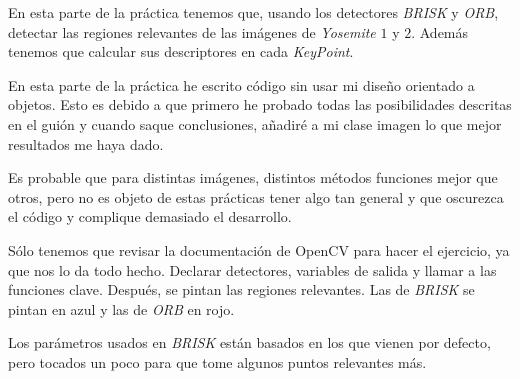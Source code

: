 \documentclass[a4paper, 11pt]{article}
\theoremstyle{definition}
\begin{document}
    En esta parte de la práctica tenemos que, usando los detectores \textit{BRISK}
    y \textit{ORB}, detectar las regiones relevantes de las imágenes de \textit{Yosemite} $1$ y $2$.
    Además tenemos que calcular sus descriptores en cada \textit{KeyPoint}.

    En esta parte de la práctica he escrito código sin usar mi diseño orientado a objetos.
    Esto es debido a que primero he probado todas las posibilidades descritas en el guión y
    cuando saque conclusiones, añadiré a mi clase imagen lo que mejor resultados me haya dado.

    Es probable que para distintas imágenes, distintos métodos funciones mejor que otros,
    pero no es objeto de estas prácticas tener algo tan general y que oscurezca el código y complique
    demasiado el desarrollo.

    Sólo tenemos que revisar la documentación de OpenCV para hacer el ejercicio, ya que nos lo da todo
    hecho. Declarar detectores, variables de salida y llamar a las funciones clave. Después, se pintan las regiones relevantes.
    Las de \textit{BRISK} se pintan en azul y las de \textit{ORB} en rojo.

    Los parámetros usados en \textit{BRISK} están basados en los que vienen por defecto,
    pero tocados un poco para que tome algunos puntos relevantes más.
\end{document}
